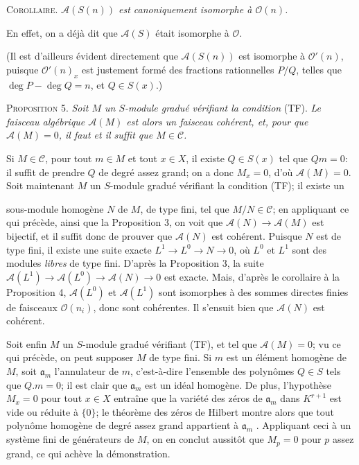 \textsc{Corollaire}. \textit{$\mathcal{A}(S(n))$ est canoniquement isomorphe à $\mathcal{O}(n)$.}

En effet, on a déjà dit que $\mathcal{A}(S)$ était isomorphe à $\mathcal{O}$.

(Il est d'ailleurs évident directement que $\mathcal{A}(S(n))$ est isomorphe à $\mathcal{O}'(n)$, puisque $\mathcal{O}'(n)_x$ est justement formé des fractions rationnelles $P/Q$, telles que $\deg P - \deg Q = n$, et $Q \in S(x)$.)

\textsc{Proposition} 5. \textit{Soit $M$ un $S$-module gradué vérifiant la condition} (TF). \textit{Le faisceau algébrique $\mathcal{A}(M)$ est alors un faisceau cohérent, et, pour que $\mathcal{A}(M) = 0$, il faut et il suffit que $M \in \mathcal{C}$.}

Si $M \in \mathcal{C}$, pour tout $m \in M$ et tout $x \in X$, il existe $Q \in S(x)$ tel que $Qm = 0$: il suffit de prendre $Q$ de degré assez grand; on a donc $M_x = 0$, d'où $\mathcal{A}(M) = 0$. Soit maintenant $M$ un $S$-module gradué vérifiant la condition (TF); il existe un




 sous-module homogène $N$ de $M$, de type fini, tel que $M/N \in \mathcal{C}$; en appliquant ce qui précède, ainsi que la Proposition 3, on voit que $\mathcal{A}(N) \to \mathcal{A}(M)$ est bijectif, et il suffit donc de prouver que $\mathcal{A}(N)$ est cohérent. Puisque $N$ est de type fini, il existe une suite exacte $L^{1} \to L^{0} \to N \to 0$, où $L^{0}$ et $L^{1}$ sont des modules \textit{libres} de type fini. D'après la Proposition 3, la suite $\mathcal{A}(L^{1}) \to \mathcal{A}(L^{0}) \to \mathcal{A}(N) \to 0$ est exacte. Mais, d'après le corollaire à la Proposition 4, $\mathcal{A}(L^{0})$ et $\mathcal{A}(L^{1})$ sont isomorphes à des sommes directes finies de faisceaux $\mathcal{O}(n_{i})$, donc sont cohérentes. Il s'ensuit bien que $\mathcal{A}(N)$ est cohérent.

Soit enfin $M$ un $S$-module gradué vérifiant (TF), et tel que $\mathcal{A}(M) = 0$; vu ce qui précède, on peut supposer $M$ de type fini. Si $m$ est un élément homogène de $M$, soit $\mathfrak{a}_{m}$ l'annulateur de $m$, c'est-à-dire l'ensemble des polynômes $Q \in S$ tels que $Q.m = 0$; il est clair que $\mathfrak{a}_{m}$ est un idéal homogène. De plus, l'hypothèse $M_{x} = 0$ pour tout $x \in X$ entraîne que la variété des zéros de $\mathfrak{a}_{m}$ dans $K^{r+1}$ est vide ou réduite à $\{0\}$; le théorème des zéros de Hilbert montre alors que tout polynôme homogène de degré assez grand appartient à $\mathfrak{a}_{m}$ . Appliquant ceci à un système fini de générateurs de $M$, on en conclut aussitôt que $M_{p} = 0$ pour $p$ assez grand, ce qui achève la démonstration.

